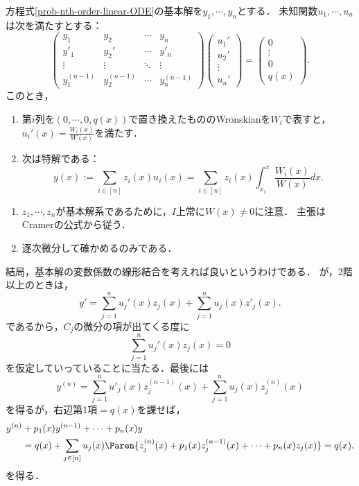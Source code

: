 \documentclass[uplatex,dvipdfmx]{jsreport}
\begin{document}
\begin{theorem}[Lagrangeの定数変化法]\label{thm-special-solution-to-linear-ODE}
    方程式\ref{prob-nth-order-linear-ODE}の基本解を$y_1,\cdots,y_n$とする．
    未知関数$u_1,\cdots,u_n$は次を満たすとする：
    \[\begin{pmatrix}y_1&y_2&\cdots&y_n\\y'_1&y_2'&\cdots&y'_n\\\vdots&\vdots&\ddots&\vdots\\y_1^{(n-1)}&y_2^{(n-1)}&\cdots&y^{(n-1)}_n\end{pmatrix}\begin{pmatrix}u_1'\\u_2'\\\vdots\\u_n'\end{pmatrix}=\begin{pmatrix}0\\\vdots\\0\\q(x)\end{pmatrix}.\]
    このとき，
    \begin{enumerate}
        \item 第$i$列を$(0,\cdots,0,q(x))$で置き換えたもののWronskianを$W_i$で表すと，
        $u_i'(x)=\frac{W_i(x)}{W(x)}$を満たす．
        \item 次は特解である：
        \[y(x):=\sum_{i\in[n]}z_i(x)u_i(x)=\sum_{i\in[n]}z_i(x)\int^x_{x_1}\frac{W_i(x)}{W(x)}dx.\]
    \end{enumerate}
\end{theorem}
\begin{Proof}\mbox{}
    \begin{enumerate}
        \item $z_1,\cdots,z_n$が基本解系であるために，$I$上常に$W(x)\ne0$に注意．
        主張はCramerの公式から従う．
        \item 逐次微分して確かめるのみである．
    \end{enumerate}
\end{Proof}
\begin{remarks}
    結局，基本解の変数係数の線形結合を考えれば良いというわけである．
    が，2階以上のときは，
    \[y'=\sum_{j=1}^nu_j'(x)z_j(x)+\sum_{j=1}^nu_j(x)z'_j(x).\]
    であるから，$C_j$の微分の項が出てくる度に
    \[\sum_{j=1}^nu_j'(x)z_j(x)=0\]
    を仮定していっていることに当たる．最後には
    \[y^{(n)}=\sum_{j=1}^nu'_j(x)z^{(n-1)}_j(x)+\sum_{j=1}^nu_j(x)z^{(n)}_j(x)\]
    を得るが，右辺第1項$=q(x)$を課せば，
    \begin{align*}
        y^{(n)}&+p_1(x)y^{(n-1)}+\cdots+p_n(x)y\\
        &=q(x)+\sum_{j\in[n]}u_j(x)\Paren{z_j^{(n)}(x)+p_1(x)z_j^{(n-1)}(x)+\cdots+p_n(x)z_j(x)}=q(x).
    \end{align*}
    を得る．
\end{remarks}
\end{document}
